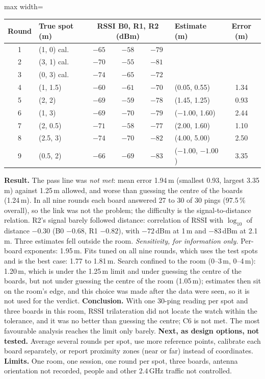 \IfFileExists{IEEEtran.cls}{\documentclass[conference]{IEEEtran}}{\documentclass[10pt,twocolumn]{article}}
\newcommand{\fitcol}[1]{\begin{adjustbox}{max width=\columnwidth}#1\end{adjustbox}}
\begin{document}
\begin{center}\footnotesize\setlength{\tabcolsep}{4pt}
\fitcol{\begin{tabular}{@{}c l ccc l c@{}}
\toprule
Round & True spot (m) & \multicolumn{3}{c}{RSSI B0, R1, R2 (dBm)} & Estimate (m) & Error (m)\\
\midrule
1 & (1, 0) cal. & $-65$ & $-58$ & $-79$ & & \\
2 & (3, 1) cal. & $-70$ & $-55$ & $-81$ & & \\
3 & (0, 3) cal. & $-74$ & $-65$ & $-72$ & & \\
4 & (1, 1.5) & $-60$ & $-61$ & $-70$ & (0.05, 0.55) & 1.34\\
5 & (2, 2) & $-69$ & $-59$ & $-78$ & (1.45, 1.25) & 0.93\\
6 & (1, 3) & $-69$ & $-70$ & $-79$ & ($-1.00$, 1.60) & 2.44\\
7 & (2, 0.5) & $-71$ & $-58$ & $-77$ & (2.00, 1.60) & 1.10\\
8 & (2.5, 3) & $-74$ & $-70$ & $-82$ & (4.00, 5.00) & 2.50\\
9 & (0.5, 2) & $-66$ & $-69$ & $-83$ & ($-1.00$, $-1.00$) & 3.35\\
\bottomrule
\end{tabular}}
\end{center}
\textbf{Result.} The pass line was \emph{not met}: mean error 1.94\,m (smallest 0.93, largest 3.35\,m) against 1.25\,m allowed, and worse than guessing the centre of the boards (1.24\,m). In all nine rounds each board answered 27 to 30 of 30 pings (97.5\,\% overall), so the link was not the problem; the difficulty is the signal-to-distance relation. R2's signal barely followed distance: correlation of RSSI with $\log_{10}$ of distance $-0.30$ (B0 $-0.68$, R1 $-0.82$), with $-72$\,dBm at 1\,m and $-83$\,dBm at 2.1\,m. Three estimates fell outside the room. \emph{Sensitivity, for information only.} Per-board exponents: 1.95\,m. Fits tuned on all nine rounds, which uses the test spots and is the best case: 1.77 to 1.81\,m. Search confined to the room (0--3\,m, 0--4\,m): 1.20\,m, which is under the 1.25\,m limit and under guessing the centre of the boards, but not under guessing the centre of the room (1.05\,m); estimates then sit on the room's edge, and this choice was made after the data were seen, so it is not used for the verdict. \textbf{Conclusion.} With one 30-ping reading per spot and three boards in this room, RSSI trilateration did not locate the watch within the tolerance, and it was no better than guessing the centre; C6 is not met. The most favourable analysis reaches the limit only barely. \textbf{Next, as design options, not tested.} Average several rounds per spot, use more reference points, calibrate each board separately, or report proximity zones (near or far) instead of coordinates. \textbf{Limits.} One room, one session, one round per spot, three boards, antenna orientation not recorded, people and other 2.4\,GHz traffic not controlled.
\end{document}
